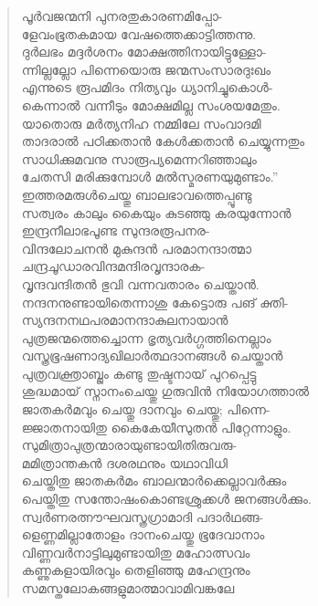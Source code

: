 \begin{verse}
പൂര്‍വജന്മനി പുനരതുകാരണമിപ്പോ-\\
ളേവംഭൂതകമായ വേഷത്തെക്കാട്ടിത്തന്നു.\\
ദുര്‍ലഭം മദ്ദര്‍ശനം മോക്ഷത്തിനായിട്ടുള്ളോ-\\
ന്നില്ലല്ലോ പിന്നെയൊരു ജന്മസംസാരദുഃഖം\\
എന്നുടെ രൂപമിദം നിത്യവും ധ്യാനിച്ചുകൊള്‍-\\
കെന്നാല്‍ വന്നീടും മോക്ഷമില്ല സംശയമേതും.\\
യാതൊരു മര്‍ത്യനിഹ നമ്മിലേ സംവാദമി\\
താദരാല്‍ പഠിക്കതാന്‍ കേള്‍ക്കതാന്‍ ചെയ്യുന്നതും\\
സാധിക്കുമവനു സാരൂപ്യമെന്നറിഞ്ഞാലും\\
ചേതസി മരിക്കുമ്പോള്‍ മല്‍സ്മരണയുമുണ്ടാം.”\\
ഇത്തരമരുള്‍ചെയ്തു ബാലഭാവത്തെപ്പൂണ്ടു\\
സത്വരം കാലും കൈയും കുടഞ്ഞു കരയുന്നോന്‍\\
ഇന്ദ്രനീലാഭപൂണ്ട സുന്ദരരൂപനര-\\
വിന്ദലോചനന്‍ മുകുന്ദന്‍ പരമാനന്ദാത്മാ\\
ചന്ദ്രചൂഡാരവിന്ദമന്ദിരവൃന്ദാരക-\\
വൃന്ദവന്ദിതന്‍ ഭുവി വന്നവതാരം ചെയ്താന്‍.\\
നന്ദനനുണ്ടായിതെന്നാശു കേട്ടൊരു പങ് ക്തി-\\
സ്യന്ദനനഥപരമാനന്ദാകുലനായാന്‍\\
പുത്രജന്മത്തെച്ചൊന്ന ഭൃത്യവര്‍ഗ്ഗത്തിനെല്ലാം\\
വസ്ത്രഭൂഷണാദ്യഖിലാര്‍ത്ഥദാനങ്ങള്‍ ചെയ്താന്‍\\
പുത്രവക്ത്രാബ്ജം കണ്ടു തുഷ്ടനായ് പുറപ്പെട്ടു\\
ശുദ്ധമായ് സ്നാനംചെയ്തു ഗുരുവിന്‍ നിയോഗത്താല്‍\\
ജാതകര്‍മവും ചെയ്തു ദാനവും ചെയ്തു; പിന്നെ-\\
ജ്ജാതനായിതു കൈകേയീസുതന്‍ പിറ്റേന്നാളും.\\
സുമിത്രാപുത്രന്മാരായുണ്ടായിതിരുവരു-\\
മമിത്രാന്തകന്‍ ദശരഥനും യഥാവിധി\\
ചെയ്തിതു ജാതകര്‍മം ബാലന്മാര്‍ക്കെല്ലാവര്‍ക്കും\\
പെയ്തിതു സന്തോഷംകൊണ്ടശ്രുക്കള്‍ ജനങ്ങള്‍ക്കും.\\
സ്വര്‍ണരത്നൗഘവസ്ത്രഗ്രാമാദി പദാര്‍ഥങ്ങ-\\
ളെണ്ണമില്ലാതോളം ദാനംചെയ്തു ഭൂദേവാനാം\\
വിണ്ണവര്‍നാട്ടിലുമുണ്ടായിതു മഹോത്സവം\\
കണ്ണുകളായിരവും തെളിഞ്ഞു മഹേന്ദ്രനും\\
സമസ്തലോകങ്ങളുമാത്മാവാമിവങ്കലേ\\

\end{verse}
